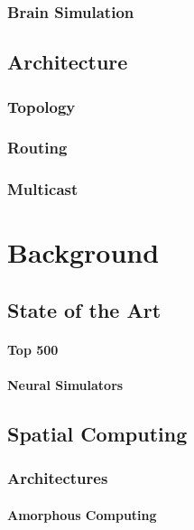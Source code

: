 \documentclass[a4paper,11pt,titlepage]{report}
\begin{document}
			\subsection{Brain Simulation}
		
		\section{Architecture}
			
			\subsection{Topology}
			
			\subsection{Routing}
			
			\subsection{Multicast}
	
	
	
	\chapter{Background}
		
		\section{State of the Art}
		
			\subsubsection{Top 500}
			
			\subsubsection{Neural Simulators}
			
			\section{Spatial Computing}
				
				\subsection{Architectures}
					
					\subsubsection{Amorphous Computing}
					
\end{document}
